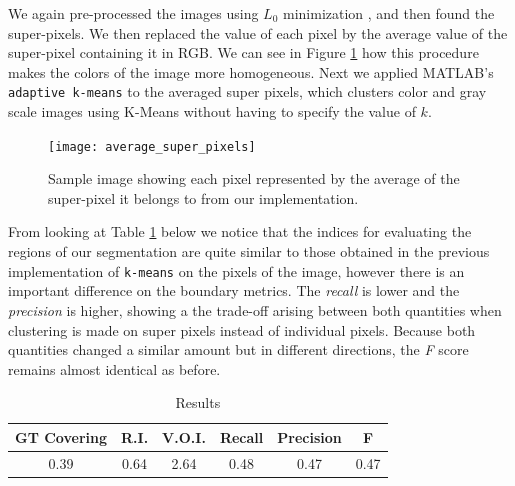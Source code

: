 \documentclass[10pt, twocolumn, twoside]{article}
\begin{document}
We again pre-processed the images using $L_0$ minimization \cite{Xu}, and then found the super-pixels. We then replaced the value of each pixel by the average value of the super-pixel containing it in RGB. We can see in Figure \ref{fig:avgsuperpixels} how this procedure makes the colors of the image more homogeneous. Next we applied MATLAB's \texttt{adaptive k-means} \cite{Bhatia} to the averaged super pixels, which clusters color and gray scale images using K-Means without having to specify the value of $k$. 

\begin{figure}[ht]
	\centering
	\texttt{[image: average\_super\_pixels]}
    \caption{Sample image showing each pixel represented by the average of the super-pixel it belongs to from our implementation.}
    \label{fig:avgsuperpixels}
\end{figure}

From looking at Table \ref{table:table_j} below we notice that the indices for evaluating the regions of our segmentation are quite similar to those obtained in the previous implementation of \texttt{k-means} on the pixels of the image, however there is an important difference on the boundary metrics. The \textit{recall} is lower and the \textit{precision} is higher, showing a the trade-off arising between both quantities when clustering is made on super pixels instead of individual pixels. Because both quantities changed a similar amount but in different directions, the \textit{F} score remains almost identical as before.



\begin{table}[ht]
\caption{Results} %
\centering %
\begin{tabular}{c c c c c c} %
\hline\hline %
GT Covering & R.I. & V.O.I. & Recall & Precision & F \\ [0.5ex] %
\hline %
 0.39 & 0.64 & 2.64 & 0.48 & 0.47 & 0.47 \\ 
\hline %
\end{tabular}
\label{table:table_j} %
\end{table}
\end{document}
